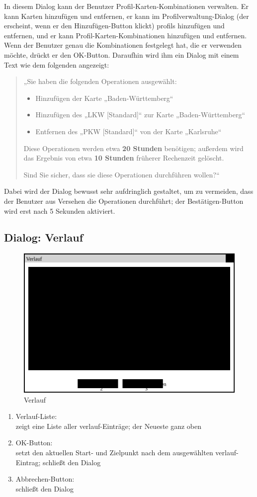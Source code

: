 \documentclass[a4paper, 11pt]{article}
\begin{document}
In diesem Dialog kann der Benutzer Profil-Karten-Kombinationen verwalten. Er kann Karten hinzufügen und entfernen, er kann im Profilverwaltung-Dialog (der erscheint, wenn er den Hinzufügen-Button klickt) \glspl{profil} hinzufügen und entfernen, und er kann Profil-Karten-Kombinationen hinzufügen und entfernen. Wenn der Benutzer genau die Kombinationen festgelegt hat, die er verwenden möchte, drückt er den OK-Button. Daraufhin wird ihm ein Dialog mit einem Text wie dem folgenden angezeigt:
\begin{quote}
  „Sie haben die folgenden Operationen ausgewählt:
  \begin{itemize}
  \item Hinzufügen der Karte „Baden-Württemberg“
  \item Hinzufügen des  „LKW [Standard]“ zur Karte „Baden-Württemberg“
  \item Entfernen des  „PKW [Standard]“ von der Karte „Karlsruhe“
  \end{itemize}
  Diese Operationen werden etwa \textbf{20 Stunden} benötigen; außerdem wird das Ergebnis von etwa \textbf{10 Stunden} früherer Rechenzeit gelöscht.
  
  Sind Sie sicher, dass sie diese Operationen durchführen wollen?“
\end{quote}
Dabei wird der Dialog bewusst sehr aufdringlich gestaltet, um zu vermeiden, dass der Benutzer aus Versehen die Operationen durchführt; der Bestätigen-Button wird erst nach 5 Sekunden aktiviert.

\subsection{Dialog: Verlauf}
\begin{figure}[H]
\centering
\includegraphics[width=0.7\linewidth]{Verlauf}
\caption{Verlauf}
\label{fig:mockupverlauf}
\end{figure}
\begin{enumerate}
\item Verlauf-Liste:\\
zeigt eine Liste aller \gls{verlauf}-Einträge; der Neueste ganz oben
\item OK-Button:\\
setzt den aktuellen Start- und Zielpunkt nach dem ausgewählten \gls{verlauf}-Eintrag; schließt den Dialog
\item Abbrechen-Button:\\
schließt den Dialog
\end{enumerate}
\end{document}
